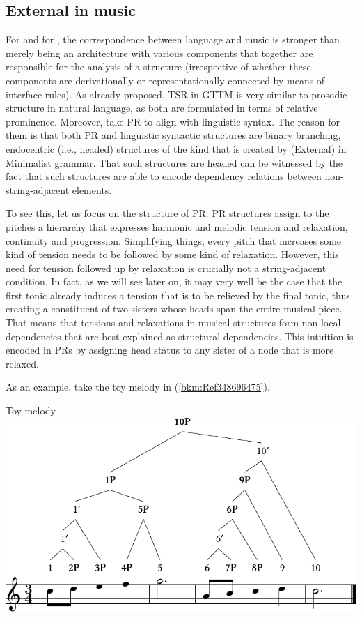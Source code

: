\documentclass[output=paper]{langsci/langscibook}
\begin{document}
\subsection{External  in music}\label{sec:key:26.3.2}

For \citeauthor{LerJac1983} and for \citeauthor{KatzPes2011}, the
correspondence between language and music is stronger than merely being an
architecture with various components that together are responsible for the
analysis of a structure (irrespective of whether these components are
derivationally or representationally connected by means of interface rules). As
\citeauthor{LerJac1983} already proposed, \gls{TSR} in \gls{GTTM} is very similar to prosodic structure in natural
language, as both are formulated in terms of relative prominence. Moreover,
\citeauthor{KatzPes2011} take \gls{PR} to align with linguistic syntax.  The
reason for them is that both \gls{PR} and linguistic syntactic structures are
binary branching, endocentric (i.e., headed) structures of the kind that is
created by (External)  in Minimalist grammar. That such structures
are headed can be witnessed by the fact that such structures are able to encode
dependency relations between non-string-adjacent elements.

To see this, let us focus on the structure of \gls{PR}. \gls{PR} structures
assign to the pitches a hierarchy that expresses harmonic and melodic tension
and relaxation, continuity and progression. Simplifying things, every pitch
that increases some kind of tension needs to be followed by some kind of
relaxation. However, this need for tension followed up by relaxation is
crucially not a string-adjacent condition. In fact, as we will see later on, it
may very well be the case that the first tonic already induces a tension that
is to be relieved by the final tonic, thus creating a constituent of two
sisters whose heads span the entire musical piece. That means that tensions and
relaxations in musical structures form non-local dependencies that are best
explained as structural dependencies.  This intuition is encoded in \glspl{PR}
by assigning head status to any sister of a node that is more relaxed.

As an example, take the toy melody in (\ref{bkm:Ref348696475}).

\ea\label{bkm:Ref348696475}Toy melody
\parencite[16]{KatzPes2011}\\[.66\baselineskip] %
    \includegraphics[scale=.9]{./img/28-7.pdf}
\z
\end{document}

